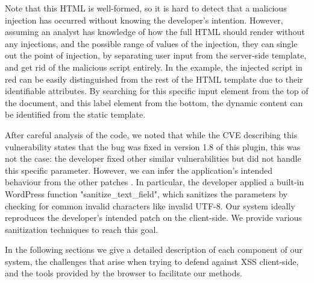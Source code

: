 Note that this HTML is well-formed, so it is hard to detect that a malicious injection has occurred without knowing the developer's intention. However, assuming an analyst has knowledge of how the full HTML should render without any injections, and the possible range of values of the injection, they can single out the point of injection, by separating user input from the server-side template, and get rid of the malicious script entirely. In the example, the injected script in red can be easily distinguished from the rest of the HTML template due to their identifiable attributes. By searching for this specific input element from the top of the document, and this label element from the bottom, the dynamic content can be identified from the static template.

After careful analysis of the code, we noted that while the CVE describing this vulnerability states that the bug was fixed in version 1.8 of this plugin, this was not the case: the developer fixed other similar vulnerabilities but did not handle this specific parameter. However, we can infer the application's intended behaviour from the other patches \cite{rccpatch}. In particular, the developer applied a built-in WordPress function "sanitize\_text\_field", which sanitizes the parameters by checking for common invalid characters like invalid UTF-8. Our system ideally reproduces the developer's intended patch on the client-side. We provide various sanitization techniques to reach this goal.

In the following sections we give a detailed description of each component of our system, the challenges that arise when trying to defend against XSS client-side, and the tools provided by the browser to facilitate our methods. 
 
